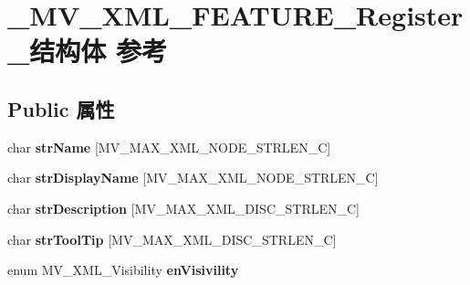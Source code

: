 \hypertarget{struct___m_v___x_m_l___f_e_a_t_u_r_e___register__}{}\section{\+\_\+\+M\+V\+\_\+\+X\+M\+L\+\_\+\+F\+E\+A\+T\+U\+R\+E\+\_\+\+Register\+\_\+结构体 参考}
\label{struct___m_v___x_m_l___f_e_a_t_u_r_e___register__}
\subsection*{Public 属性}
\begin{DoxyCompactItemize}
\item 
\mbox{\label{struct___m_v___x_m_l___f_e_a_t_u_r_e___register___a5692444d4948b191fe5245fd067a75cf}} 
char {\bfseries str\+Name} \mbox{[}M\+V\+\_\+\+M\+A\+X\+\_\+\+X\+M\+L\+\_\+\+N\+O\+D\+E\+\_\+\+S\+T\+R\+L\+E\+N\+\_\+C\mbox{]}
\item 
\mbox{\label{struct___m_v___x_m_l___f_e_a_t_u_r_e___register___ad7b5b5c6eb1aec5d96f1363613ea22f8}} 
char {\bfseries str\+Display\+Name} \mbox{[}M\+V\+\_\+\+M\+A\+X\+\_\+\+X\+M\+L\+\_\+\+N\+O\+D\+E\+\_\+\+S\+T\+R\+L\+E\+N\+\_\+C\mbox{]}
\item 
\mbox{\label{struct___m_v___x_m_l___f_e_a_t_u_r_e___register___a36ecc80aaa5401f8d00a562f697e62d8}} 
char {\bfseries str\+Description} \mbox{[}M\+V\+\_\+\+M\+A\+X\+\_\+\+X\+M\+L\+\_\+\+D\+I\+S\+C\+\_\+\+S\+T\+R\+L\+E\+N\+\_\+C\mbox{]}
\item 
\mbox{\label{struct___m_v___x_m_l___f_e_a_t_u_r_e___register___a40db457bb1765cbddd94271114d81cb6}} 
char {\bfseries str\+Tool\+Tip} \mbox{[}M\+V\+\_\+\+M\+A\+X\+\_\+\+X\+M\+L\+\_\+\+D\+I\+S\+C\+\_\+\+S\+T\+R\+L\+E\+N\+\_\+C\mbox{]}
\item 
\mbox{\label{struct___m_v___x_m_l___f_e_a_t_u_r_e___register___aedb1097784e1b16dce8ba113c52a82b6}} 
enum M\+V\+\_\+\+X\+M\+L\+\_\+\+Visibility {\bfseries en\+Visivility}

\end{DoxyCompactItemize}
